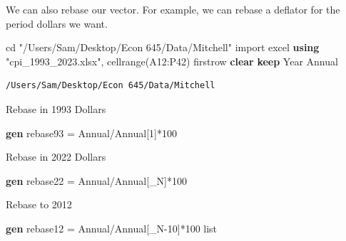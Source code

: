 \documentclass[
]{book}
\newenvironment{Shaded}{\begin{snugshade}}{\end{snugshade}}
\newcommand{\KeywordTok}[1]{\textcolor[rgb]{0.13,0.29,0.53}{\textbf{#1}}}
\newcommand{\NormalTok}[1]{#1}
\newcommand{\OtherTok}[1]{\textcolor[rgb]{0.56,0.35,0.01}{#1}}
\newcommand{\StringTok}[1]{\textcolor[rgb]{0.31,0.60,0.02}{#1}}
\begin{document}
We can also rebase our vector. For example, we can rebase a deflator for the
period dollars we want.

\begin{Shaded}
\begin{Highlighting}[]
\NormalTok{cd }\StringTok{"/Users/Sam/Desktop/Econ 645/Data/Mitchell"}
\NormalTok{import excel }\KeywordTok{using} \StringTok{"cpi\_1993\_2023.xlsx"}\NormalTok{, cellrange(A12:P42) firstrow }\KeywordTok{clear}
\KeywordTok{keep}\NormalTok{ Year Annual}
\end{Highlighting}
\end{Shaded}

\begin{verbatim}
/Users/Sam/Desktop/Econ 645/Data/Mitchell
\end{verbatim}

Rebase in 1993 Dollars

\begin{Shaded}
\begin{Highlighting}[]
\KeywordTok{gen}\NormalTok{ rebase93 = Annual/Annual[1]*100}
\end{Highlighting}
\end{Shaded}

Rebase in 2022 Dollars

\begin{Shaded}
\begin{Highlighting}[]
\KeywordTok{gen}\NormalTok{ rebase22 = Annual/Annual[\_N]*100}
\end{Highlighting}
\end{Shaded}

Rebase to 2012

\begin{Shaded}
\begin{Highlighting}[]
\KeywordTok{gen}\NormalTok{ rebase12 = Annual/Annual[\_N{-}10]*100}
\OtherTok{list}
\end{Highlighting}
\end{Shaded}
\end{document}
